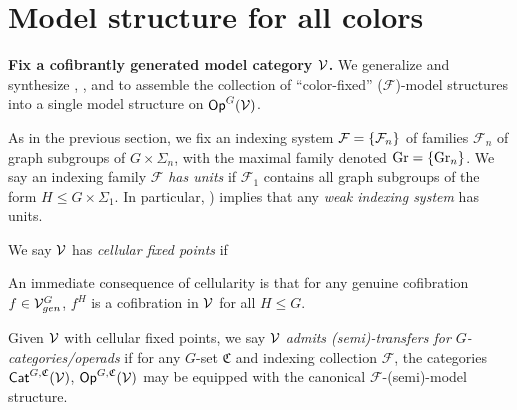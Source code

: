 \documentclass[a4paper,10pt
,draft
]{article}%
\renewcommand{\F}{\mathcal F}
\renewcommand{\1}{\ensuremath{\mathbb{id}}}
\begin{document}
\newpage

\section{Model structure for all colors} 
\renewcommand{\C}{\mathfrak C}

\textbf{Fix a cofibrantly generated model category $\mathcal V$.}
We generalize and synthesize \cite{BM13}, \cite{Cav14}, and \cite{CM13b} to assemble the collection of
``color-fixed'' ($\F$)-model structures into a single model structure on $\mathsf{Op}^G(\mathcal V)$.




As in the previous section, we fix an indexing system $\F = \set{\F_n}$ of families $\F_n$ of graph subgroups of $G \times \Sigma_n$,
with the maximal family denoted $\mathrm{Gr} = \left\{\mathrm{Gr}_n\right\}$.
We say an indexing family $\F$ \textit{has units} if
$\F_1$ contains all graph subgroups of the form $H \leq G \times \Sigma_1$.
In particular, \cite[Remark 4.50]{BP17}) implies that any \textit{weak indexing system} has units.

\begin{definition}
      We say $\mathcal V$ has \textit{cellular fixed points} if
\end{definition}

\begin{remark}
      \label{LEVEL_COF_REM}
      An immediate consequence of cellularity is that for any genuine cofibration $f \in \mathcal V^G_{gen}$,
      $f^H$ is a cofibration in $\mathcal V$ for all $H \leq G$.
\end{remark}

\begin{definition}
      Given $\mathcal V$ with cellular fixed points, we say
      $\mathcal V$ \textit{admits (semi)-transfers for $G$-categories/operads} if
      for any $G$-set $\mathfrak C$ and indexing collection $\F$,
      the categories $\mathsf{Cat}^{G, \mathfrak C}(\mathcal V)$, $\mathsf{Op}^{G, \mathfrak C}(\mathcal V)$
      may be equipped with the canonical $\F$-(semi)-model structure.
\end{definition}
\end{document}
